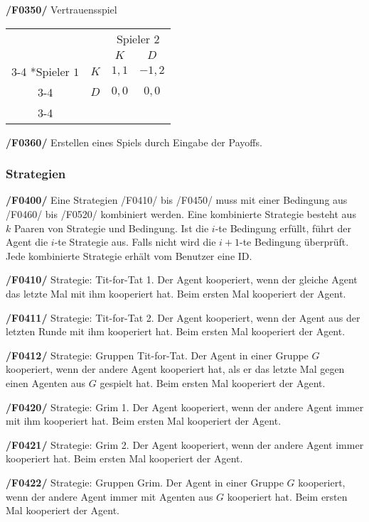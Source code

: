\textbf{/F0350/} 
Vertrauensspiel
\begin{table}[H]
\centering
\setlength{\extrarowheight}{2pt}
\begin{tabular}{cc|c|c|}
  & \multicolumn{1}{c}{} & \multicolumn{2}{c}{Spieler $2$} \\
  & \multicolumn{1}{c}{} & \multicolumn{1}{c}{$K$} & \multicolumn{1}{c}{$D$} \\\cline{3-4}
  \multirow{2}*{Spieler $1$} & $K$ & $1,1$ & $-1,2$ \\\cline{3-4} 
  & $D$ & $0,0$ & $0,0$ \\\cline{3-4}
\end{tabular}
\end{table}

\textbf{/F0360/} 
Erstellen eines Spiels durch Eingabe der Payoffs.

\subsubsection{Strategien}

\textbf{/F0400/}
Eine Strategien /F0410/ bis /F0450/ muss mit einer Bedingung aus /F0460/ bis /F0520/ kombiniert werden. Eine kombinierte Strategie besteht aus $k$ Paaren von Strategie und Bedingung. Ist die $i$-te Bedingung erfüllt, führt der Agent die $i$-te Strategie aus. Falls nicht wird die $i+1$-te Bedingung überprüft. Jede kombinierte Strategie erhält vom Benutzer eine ID.

\textbf{/F0410/} 
Strategie: Tit-for-Tat 1. Der Agent kooperiert, wenn der {\color{red}gleiche} Agent das letzte Mal mit ihm kooperiert hat. Beim ersten Mal kooperiert der Agent.

{\color{red}
\textbf{/F0411/}
Strategie: Tit-for-Tat 2. Der Agent kooperiert, wenn der Agent aus der letzten Runde mit ihm kooperiert hat. Beim ersten Mal kooperiert der Agent.

\textbf{/F0412/}
Strategie: Gruppen Tit-for-Tat. Der Agent in einer Gruppe $G$ kooperiert, wenn der andere Agent kooperiert hat, als er das letzte Mal gegen einen Agenten aus $G$ gespielt hat. Beim ersten Mal kooperiert der Agent.
}

\textbf{/F0420/} 
Strategie: Grim 1. Der Agent kooperiert, wenn der andere Agent immer mit ihm kooperiert hat. Beim ersten Mal kooperiert der Agent.

{\color{red}
\textbf{/F0421/}
Strategie: Grim 2. Der Agent kooperiert, wenn der andere Agent immer kooperiert hat. Beim ersten Mal kooperiert der Agent.

\textbf{/F0422/}
Strategie: Gruppen Grim. Der Agent in einer Gruppe $G$ kooperiert, wenn der andere Agent immer mit Agenten aus $G$ kooperiert hat. Beim ersten Mal kooperiert der Agent.
}

